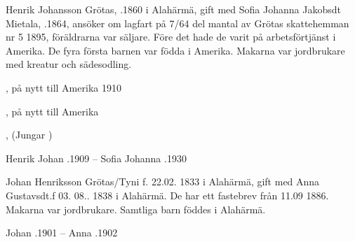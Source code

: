 Henrik Johansson Grötas, .1860  i Alahärmä, gift med Sofia Johanna Jakobsdt Mietala, .1864, ansöker om lagfart på 7/64 del mantal av Grötas skattehemman nr 5  1895, föräldrarna var säljare. Före det hade de varit på arbetsförtjänst i Amerika. De fyra första barnen var födda i Amerika. Makarna var jordbrukare med kreatur och sädesodling.
\begin{jhchildren}
  \item {}, på nytt till Amerika 1910
  \item {}, på nytt till Amerika
  \item {}
  \item {}
  \item {}
  \item {}
  \item {}
  \item {}, (Jungar     )
\end{jhchildren}
Henrik Johan .1909  --  Sofia Johanna .1930

Johan Henriksson  Grötas/Tyni f. 22.02. 1833 i Alahärmä, gift med Anna Gustavsdt.f 03. 08.. 1838 i Alahärmä. De har ett fastebrev från 11.09 1886.  Makarna var jordbrukare. Samtliga barn föddes i Alahärmä.
\begin{jhchildren}
  \item {}
  \item {}
  \item {}
  \item {}
  \item {}
  \item {}
  \item {}
  \item {}
\end{jhchildren}
Johan .1901  --  Anna .1902



